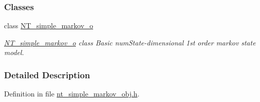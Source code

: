 \subsubsection*{Classes}
\begin{DoxyCompactItemize}
\item 
class \hyperlink{class_n_t__simple__markov__o}{NT\_\-simple\_\-markov\_\-o}
\begin{DoxyCompactList}\small\item\em \hyperlink{class_n_t__simple__markov__o}{NT\_\-simple\_\-markov\_\-o} class Basic numState-\/dimensional 1st order markov state model. \item\end{DoxyCompactList}\end{DoxyCompactItemize}


\subsubsection{Detailed Description}


Definition in file \hyperlink{nt__simple__markov__obj_8h_source}{nt\_\-simple\_\-markov\_\-obj.h}.

